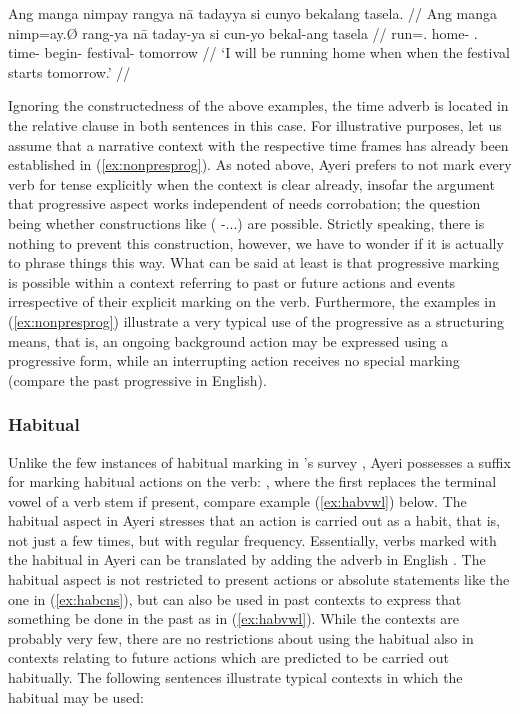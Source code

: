 \a\label{ex:futprog}\begingl
	\gla Ang manga nimpay rangya nā tadayya si cunyo bekalang tasela. //
	\glb Ang manga nimp=ay.Ø rang-ya nā taday-ya si cun-yo bekal-ang 
		tasela //
	\glc \AgtT{} \Prog{} run=\Fsg{}.\Top{} home-\Loc{} \Fsg{}.\Gen{} 
		time-\Loc{} \Rel{} begin-\TsgN{} festival-\Aarg{} tomorrow //
	\glft `I will be running home when when the festival starts 
		tomorrow.' //
\endgl

\xe

Ignoring the constructedness of the above examples, the time adverb is located 
in the relative clause in both sentences in this case. For illustrative 
purposes, let us assume that a narrative context with the respective time 
frames has already been established in (\ref{ex:nonpresprog}). As noted above, 
Ayeri prefers to not mark every verb for tense explicitly when the context is 
clear already, insofar the argument that progressive aspect works independent 
of  needs corrobation; the question being whether constructions like 
 (\Prog{} \Pst{}-...) are possible. Strictly 
speaking, there is nothing to prevent this construction, however, we have to 
wonder if it is actually  to phrase things this way. What can be 
said at least is that progressive marking is possible within a context 
referring to past or future actions and events irrespective of their explicit 
marking on the verb. Furthermore, the examples in (\ref{ex:nonpresprog}) 
illustrate a very typical use of the progressive as a structuring means, that 
is, an ongoing background action may be expressed using a progressive form, 
while an interrupting action receives no special marking (compare the past 
progressive in English).


\subsubsection{Habitual}

Unlike the few instances of habitual marking in \citet{dahl1985}'s survey
\citep[96]{dahl1985}, Ayeri possesses a suffix for marking habitual actions on
the verb: , where the first  replaces the terminal vowel
of a verb stem if present, compare example (\ref{ex:habvwl}) below. The
habitual aspect in Ayeri stresses that an action is carried out as a habit,
that is, not just a few times, but with regular frequency. Essentially, verbs
marked with the habitual in Ayeri can be translated by adding the adverb
 in English \citep[97]{dahl1985}. The habitual aspect is not
restricted to present actions or absolute statements like the one in
(\ref{ex:habcns}), but can also be used in past contexts to express that
something  be done in the past as in (\ref{ex:habvwl}).
While the contexts are probably very few, there are no restrictions about using
the habitual also in contexts relating to future actions which are predicted to
be carried out habitually. The following sentences illustrate typical contexts
in which the habitual may be used:

